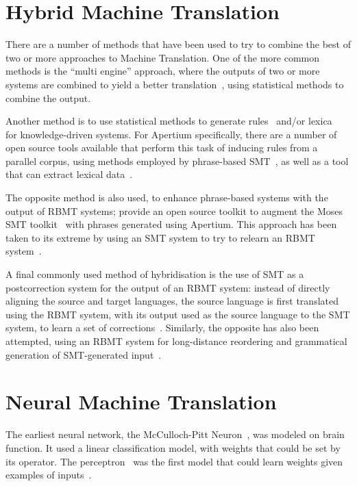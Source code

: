 \section{Hybrid Machine Translation}

There are a number of methods that have been used to try to combine the best of two or more approaches to
Machine Translation. One of the more common methods is the ``multi engine'' approach, where the outputs
of two or more systems are combined to yield a better translation~\citep{Heafield-wmt10,Hogan:1998:EMM:648179.749224,eisele2008hybridmemt},
using statistical methods to combine the output.

Another method is to use statistical methods to generate rules~\citep{dugast2009selective} and/or lexica~\citep{Surcin_2007.rapid} for knowledge-driven systems.
For Apertium specifically, there are a number of open source tools available that perform this task of 
inducing rules from a parallel corpus, using methods employed by phrase-based SMT~\citep{sanchez06a,sanchez-cartagena16b},
as well as a tool that can extract lexical data~\citep{Caseli2006}.

The opposite method is also used, to enhance phrase-based systems with the output of RBMT systems; \citet{sanchez-cartagena12a}
provide an open source toolkit to augment the Moses SMT toolkit~\citep{Koehn:2007:MOS:1557769.1557821} with phrases generated
using Apertium. This approach has been taken to its extreme by using an SMT system to try to relearn an RBMT system~\citep{Dugast:2008:WRR:1626394.1626421}.

A final commonly used method of hybridisation is the use of SMT as a postcorrection system for the output of
an RBMT system: instead of directly aligning the source and target languages, the source language is first
translated using the RBMT system, with its output used as the source language to the SMT system, to learn
a set of corrections~\citep{dugast-senellart-koehn:2007:WMT}. Similarly, the opposite has also been attempted,
using an RBMT system for long-distance reordering and grammatical generation of SMT-generated input~\citep{ahsan2010coupling}.

\section{Neural Machine Translation}

The earliest neural network, the McCulloch-Pitt Neuron~\citep{McCulloch1988}, was modeled on brain function.
It used a linear classification model, with weights that could be set by its operator. The 
perceptron~\citep{Rosenblatt58theperceptron} was the first model that could
learn weights given examples of inputs~\citep[p. 15]{goodfellow2016dl}.

